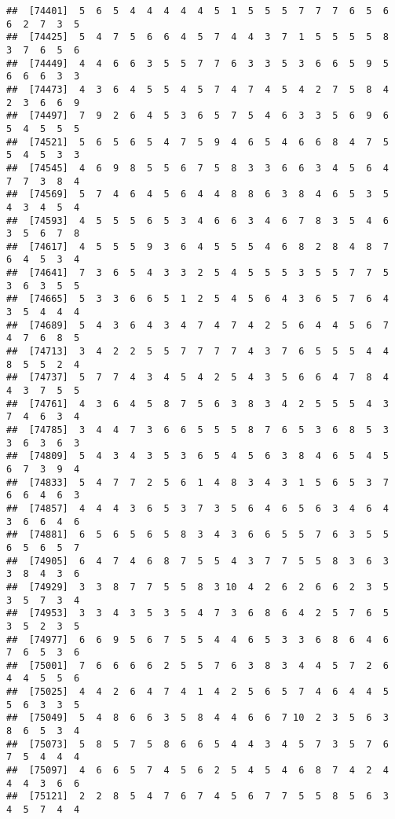 \documentclass[
]{book}
\begin{document}
\begin{verbatim}
##  [74401]  5  6  5  4  4  4  4  4  5  1  5  5  5  7  7  7  6  5  6  6  2  7  3  5
##  [74425]  5  4  7  5  6  6  4  5  7  4  4  3  7  1  5  5  5  5  8  3  7  6  5  6
##  [74449]  4  4  6  6  3  5  5  7  7  6  3  3  5  3  6  6  5  9  5  6  6  6  3  3
##  [74473]  4  3  6  4  5  5  4  5  7  4  7  4  5  4  2  7  5  8  4  2  3  6  6  9
##  [74497]  7  9  2  6  4  5  3  6  5  7  5  4  6  3  3  5  6  9  6  5  4  5  5  5
##  [74521]  5  6  5  6  5  4  7  5  9  4  6  5  4  6  6  8  4  7  5  5  4  5  3  3
##  [74545]  4  6  9  8  5  5  6  7  5  8  3  3  6  6  3  4  5  6  4  7  7  3  8  4
##  [74569]  5  7  4  6  4  5  6  4  4  8  8  6  3  8  4  6  5  3  5  4  3  4  5  4
##  [74593]  4  5  5  5  6  5  3  4  6  6  3  4  6  7  8  3  5  4  6  3  5  6  7  8
##  [74617]  4  5  5  5  9  3  6  4  5  5  5  4  6  8  2  8  4  8  7  6  4  5  3  4
##  [74641]  7  3  6  5  4  3  3  2  5  4  5  5  5  3  5  5  7  7  5  3  6  3  5  5
##  [74665]  5  3  3  6  6  5  1  2  5  4  5  6  4  3  6  5  7  6  4  3  5  4  4  4
##  [74689]  5  4  3  6  4  3  4  7  4  7  4  2  5  6  4  4  5  6  7  4  7  6  8  5
##  [74713]  3  4  2  2  5  5  7  7  7  7  4  3  7  6  5  5  5  4  4  8  5  5  2  4
##  [74737]  5  7  7  4  3  4  5  4  2  5  4  3  5  6  6  4  7  8  4  4  3  7  5  5
##  [74761]  4  3  6  4  5  8  7  5  6  3  8  3  4  2  5  5  5  4  3  7  4  6  3  4
##  [74785]  3  4  4  7  3  6  6  5  5  5  8  7  6  5  3  6  8  5  3  3  6  3  6  3
##  [74809]  5  4  3  4  3  5  3  6  5  4  5  6  3  8  4  6  5  4  5  6  7  3  9  4
##  [74833]  5  4  7  7  2  5  6  1  4  8  3  4  3  1  5  6  5  3  7  6  6  4  6  3
##  [74857]  4  4  4  3  6  5  3  7  3  5  6  4  6  5  6  3  4  6  4  3  6  6  4  6
##  [74881]  6  5  6  5  6  5  8  3  4  3  6  6  5  5  7  6  3  5  5  6  5  6  5  7
##  [74905]  6  4  7  4  6  8  7  5  5  4  3  7  7  5  5  8  3  6  3  3  8  4  3  6
##  [74929]  3  3  8  7  7  5  5  8  3 10  4  2  6  2  6  6  2  3  5  3  5  7  3  4
##  [74953]  3  3  4  3  5  3  5  4  7  3  6  8  6  4  2  5  7  6  5  3  5  2  3  5
##  [74977]  6  6  9  5  6  7  5  5  4  4  6  5  3  3  6  8  6  4  6  7  6  5  3  6
##  [75001]  7  6  6  6  6  2  5  5  7  6  3  8  3  4  4  5  7  2  6  4  4  5  5  6
##  [75025]  4  4  2  6  4  7  4  1  4  2  5  6  5  7  4  6  4  4  5  5  6  3  3  5
##  [75049]  5  4  8  6  6  3  5  8  4  4  6  6  7 10  2  3  5  6  3  8  6  5  3  4
##  [75073]  5  8  5  7  5  8  6  6  5  4  4  3  4  5  7  3  5  7  6  7  5  4  4  4
##  [75097]  4  6  6  5  7  4  5  6  2  5  4  5  4  6  8  7  4  2  4  4  4  3  6  6
##  [75121]  2  2  8  5  4  7  6  7  4  5  6  7  7  5  5  8  5  6  3  4  5  7  4  4

\end{verbatim}
\end{document}
